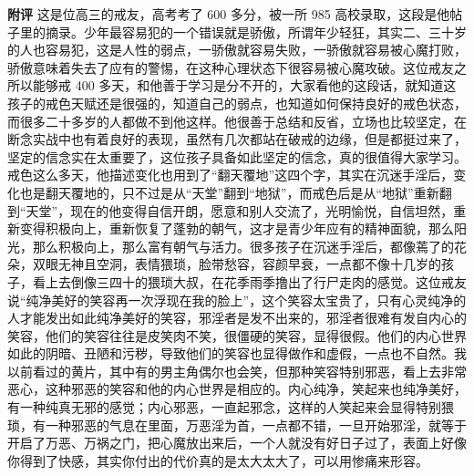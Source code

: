 \begin{case}
    \textbf{附评} 这是位高三的戒友，高考考了 600 多分，被一所 985 高校录取，这段是他帖子里的摘录。少年最容易犯的一个错误就是骄傲，所谓年少轻狂，其实二、三十岁的人也容易犯，这是人性的弱点，一骄傲就容易失败，一骄傲就容易被心魔打败，骄傲意味着失去了应有的警惕，在这种心理状态下很容易被心魔攻破。这位戒友之所以能够戒 400 多天，和他善于学习是分不开的，大家看他的这段话，就知道这孩子的戒色天赋还是很强的，知道自己的弱点，也知道如何保持良好的戒色状态，而很多二十多岁的人都做不到他这样。他很善于总结和反省，立场也比较坚定，在断念实战中也有着良好的表现，虽然有几次都站在破戒的边缘，但是都挺过来了，坚定的信念实在太重要了，这位孩子具备如此坚定的信念，真的很值得大家学习。戒色这么多天，他描述变化也用到了“翻天覆地”这四个字，其实在沉迷手淫后，变化也是翻天覆地的，只不过是从“天堂”翻到“地狱”，而戒色后是从“地狱”重新翻到“天堂”，现在的他变得自信开朗，愿意和别人交流了，光明愉悦，自信坦然，重新变得积极向上，重新恢复了蓬勃的朝气，这才是青少年应有的精神面貌，那么阳光，那么积极向上，那么富有朝气与活力。很多孩子在沉迷手淫后，都像蔫了的花朵，双眼无神且空洞，表情猥琐，脸带愁容，容颜早衰，一点都不像十几岁的孩子，看上去倒像三四十的猥琐大叔，在花季雨季撸出了行尸走肉的感觉。这位戒友说“纯净美好的笑容再一次浮现在我的脸上”，这个笑容太宝贵了，只有心灵纯净的人才能发出如此纯净美好的笑容，邪淫者是发不出来的，邪淫者很难有发自内心的笑容，他们的笑容往往是皮笑肉不笑，很僵硬的笑容，显得很假。他们的内心世界如此的阴暗、丑陋和污秽，导致他们的笑容也显得做作和虚假，一点也不自然。我以前看过的黄片，其中有的男主角偶尔也会笑，但那种笑容特别邪恶，看上去非常恶心，这种邪恶的笑容和他的内心世界是相应的。内心纯净，笑起来也纯净美好，有一种纯真无邪的感觉；内心邪恶，一直起邪念，这样的人笑起来会显得特别猥琐，有一种邪恶的气息在里面，万恶淫为首，一点都不错，一旦开始邪淫，就等于开启了万恶、万祸之门，把心魔放出来后，一个人就没有好日子过了，表面上好像你得到了快感，其实你付出的代价真的是太大太大了，可以用惨痛来形容。


\end{case}
